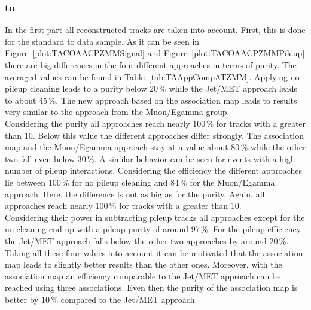 \subsubsection{\Zz to \MM \label{sec:TASEFRDACPZMM}}
In the first part all reconstructed tracks are taken into account. First, this is done for the standard \Zz to \MM data sample. As it can be seen in Figure~\ref{plot:TACOAACPZMMSignal} and Figure~\ref{plot:TACOAACPZMMPileup} there are big differences in the four different approaches in terms of purity. The averaged values can be found in Table~\ref{tab:TAAppCompATZMM}. Applying no pileup cleaning leads to a purity below $20\,\%$ while the Jet/MET approach leads to about $45\,\%$. The new approach based on the association map leads to results very similar to the approach from the Muon/Egamma group. \\
Considering the purity all approaches reach nearly $100\,\%$ for tracks with a \pt greater than 10\GeV. Below this value the different approaches differ strongly. The association map and the Muon/Egamma approach stay at a value about $80\,\%$ while the other two fall even below $30\,\%$. A similar behavior can be seen for events with a high number of pileup interactions. Considering the efficiency the different approaches lie between $100\,\%$ for no pileup cleaning and $84\,\%$ for the Muon/Egamma approach. Here, the difference is not as big as for the purity. Again, all approaches reach nearly $100\,\%$ for tracks with a \pt greater than 10\GeV. \\
Considering their power in subtracting pileup tracks all approaches except for the no cleaning end up with a pileup purity of around $97\,\%$. For the pileup efficiency the Jet/MET approach falls below the other two approaches by around $20\,\%$.\\
Taking all these four values into account it can be motivated that the association map leads to slightly better results than the other ones. Moreover, with the association map an efficiency comparable to the Jet/MET approach can be reached using three associations. Even then the purity of the association map is better by $10\,\%$ compared to the Jet/MET approach.



